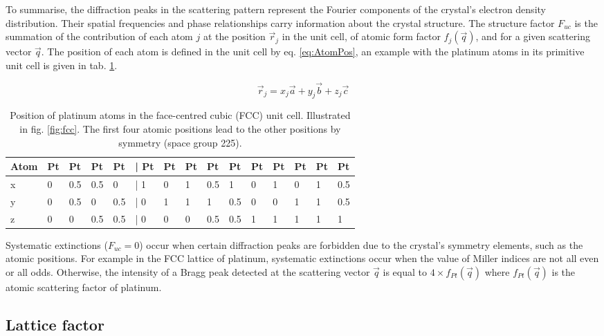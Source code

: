 To summarise, the diffraction peaks in the scattering pattern represent the Fourier components of the crystal's electron density distribution.
Their spatial frequencies and phase relationships carry information about the crystal structure.
The structure factor $F_{uc}$ is the summation of the contribution of each atom $j$ at the position $\vec{r}_j$ in the unit cell, of atomic form factor $f_j(\vec{q})$, and for a given scattering vector $\vec{q}$.
The position of each atom is defined in the unit cell by eq. \ref{eq:AtomPos}, an example with the platinum atoms in its primitive unit cell is given in tab. \ref{tab:PtAtoms}.

\begin{equation}
    \label{eq:AtomPos}
    \vec{r}_j = x_j\vec{a} + y_j\vec{b} + z_j\vec{c}
\end{equation}

\begin{table}[!htb]
    \centering
    \begin{tabular}{@{}lllllllllllllll@{}}
    \toprule
    Atom & Pt & Pt  & Pt  & Pt  & | Pt & Pt & Pt & Pt  & Pt  & Pt & Pt & Pt & Pt & Pt  \\ \midrule
    x    & 0  & 0.5 & 0.5 & 0   & | 1  & 0  & 1  & 0.5 & 1   & 0  & 1  & 0  & 1  & 0.5 \\
    y    & 0  & 0.5 & 0   & 0.5 & | 0  & 1  & 1  & 1   & 0.5 & 0  & 0  & 1  & 1  & 0.5 \\
    z    & 0  & 0   & 0.5 & 0.5 & | 0  & 0  & 0  & 0.5 & 0.5 & 1  & 1  & 1  & 1  & 1   \\ \bottomrule
    \end{tabular}
    \caption{Position of platinum atoms in the face-centred cubic (FCC) unit cell. Illustrated in fig. \ref{fig:fcc}. The first four atomic positions  lead to the other positions by symmetry (space group 225).}
    \label{tab:PtAtoms}
\end{table}

Systematic extinctions ($F_{uc} = 0$) occur when certain diffraction peaks are forbidden due to the crystal's symmetry elements, such as the atomic positions.
For example in the FCC lattice of platinum, systematic extinctions occur when the value of Miller indices are not all even or all odds.
Otherwise, the intensity of a Bragg peak detected at the scattering vector $\vec{q}$ is equal to $4\times f_{Pt}(\vec{q})$ where $f_{Pt}(\vec{q})$ is the atomic scattering factor of platinum.

\subsection{Lattice factor} \label{sec:LatticeFactor}

